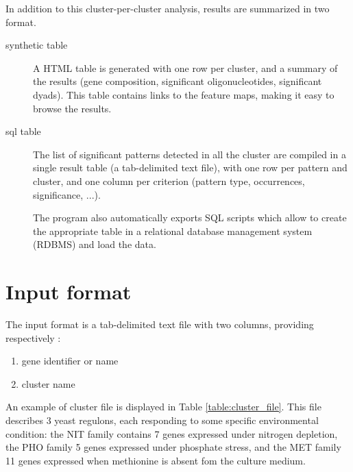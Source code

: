 In addition to this cluster-per-cluster analysis, results are
summarized in two format.

\begin{description}
\item[synthetic table] A HTML table is generated with one row per
cluster, and a summary of the results (gene composition, significant
oligonucleotides, significant dyads). This table contains links to the
feature maps, making it easy to browse the results.

\item[sql table] The list of significant patterns detected in all the
cluster are compiled in a single result table (a tab-delimited text
file), with one row per pattern and cluster, and one column per
criterion (pattern type, occurrences, significance, ...). 

The program also automatically exports SQL scripts which allow to
create the appropriate table in a relational database management
system (RDBMS) and load the data.
\end{description}

\section{Input format}

The input format is a tab-delimited text file with two columns, providing respectively :
\begin{enumerate}
\item gene identifier or name
\item cluster name
\end{enumerate}

An example of cluster file is displayed in Table
\ref{table:cluster_file}. This file describes 3 yeast regulons, each
responding to some specific environmental condition: the NIT family
contains 7 genes expressed under nitrogen depletion, the PHO family 5
genes expressed under phosphate stress, and the MET family 11 genes
expressed when methionine is absent fom the culture medium.

